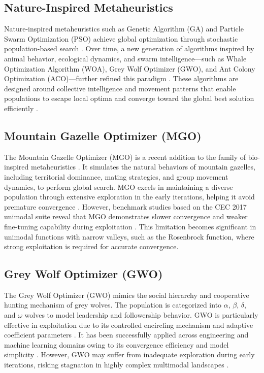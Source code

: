 \documentclass[12pt,a4paper]{article}
\begin{document}
\subsection{Nature-Inspired Metaheuristics}
Nature-inspired metaheuristics such as Genetic Algorithm (GA) and Particle Swarm Optimization (PSO) achieve global optimization through stochastic population-based search \cite{ga, pso}. Over time, a new generation of algorithms inspired by animal behavior, ecological dynamics, and swarm intelligence—such as Whale Optimization Algorithm (WOA), Grey Wolf Optimizer (GWO), and Ant Colony Optimization (ACO)—further refined this paradigm \cite{mirjalili2016woa, gwo}. These algorithms are designed around collective intelligence and movement patterns that enable populations to escape local optima and converge toward the global best solution efficiently \cite{mirjalili2015mfo, pso_mw}.

\subsection{Mountain Gazelle Optimizer (MGO)}
The Mountain Gazelle Optimizer (MGO) is a recent addition to the family of bio-inspired metaheuristics \cite{mgo}. It simulates the natural behaviors of mountain gazelles, including territorial dominance, mating strategies, and group movement dynamics, to perform global search. MGO excels in maintaining a diverse population through extensive exploration in the early iterations, helping it avoid premature convergence \cite{gharehchopogh2020}. However, benchmark studies based on the CEC 2017 unimodal suite reveal that MGO demonstrates slower convergence and weaker fine-tuning capability during exploitation \cite{benchmark, wilcoxon}. This limitation becomes significant in unimodal functions with narrow valleys, such as the Rosenbrock function, where strong exploitation is required for accurate convergence.

\subsection{Grey Wolf Optimizer (GWO)}
The Grey Wolf Optimizer (GWO) \cite{gwo} mimics the social hierarchy and cooperative hunting mechanism of grey wolves. The population is categorized into $\alpha$, $\beta$, $\delta$, and $\omega$ wolves to model leadership and followership behavior. GWO is particularly effective in exploitation due to its controlled encircling mechanism and adaptive coefficient parameters \cite{banaie2021}. It has been successfully applied across engineering and machine learning domains owing to its convergence efficiency and model simplicity \cite{balani2021}. However, GWO may suffer from inadequate exploration during early iterations, risking stagnation in highly complex multimodal landscapes \cite{elaziz2021}.
\end{document}
